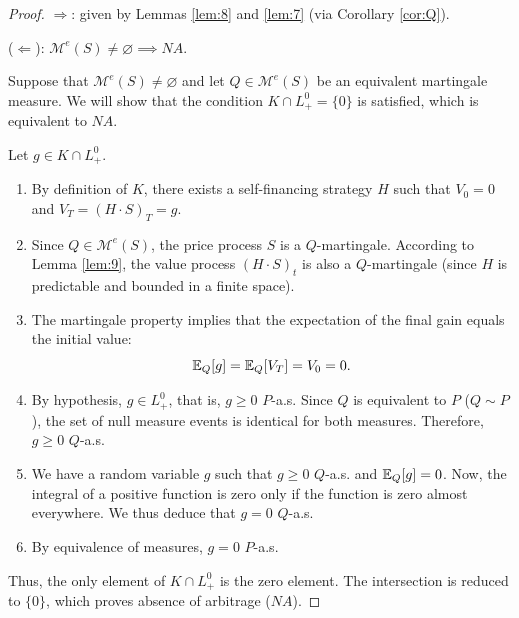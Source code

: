 \begin{proof}
\emph{$\Rightarrow$}: given by Lemmas \ref{lem:8} and \ref{lem:7} (via Corollary \ref{cor:Q}).

\smallskip
\noindent
(\emph{$\Leftarrow$}): $\mathcal{M}^e(S) \neq \varnothing \implies NA$.

\smallskip
Suppose that $\mathcal{M}^e(S) \neq \varnothing$ and let $Q \in \mathcal{M}^e(S)$ be an equivalent martingale measure.
We will show that the condition $K \cap L_+^0 = \{0\}$ is satisfied, which is equivalent to $NA$.

Let $g \in K \cap L_+^0$.
\begin{enumerate}
    \item By definition of $K$, there exists a self-financing strategy $H$ such that $V_0 = 0$ and $V_T = (H \cdot S)_T = g$.
    \item Since $Q \in \mathcal{M}^e(S)$, the price process $S$ is a $Q$-martingale. According to Lemma \ref{lem:9}, the value process $(H \cdot S)_t$ is also a $Q$-martingale (since $H$ is predictable and bounded in a finite space).
    \item The martingale property implies that the expectation of the final gain equals the initial value:
    \[
    \mathbb{E}_Q[g] = \mathbb{E}_Q[V_T] = V_0 = 0.
    \]
    \item By hypothesis, $g \in L_+^0$, that is, $g \ge 0$ $P$-a.s.
    Since $Q$ is equivalent to $P$ ($Q \sim P$), the set of null measure events is identical for both measures. Therefore, $g \ge 0$ $Q$-a.s.
    \item We have a random variable $g$ such that $g \ge 0$ $Q$-a.s. and $\mathbb{E}_Q[g] = 0$.
    Now, the integral of a positive function is zero only if the function is zero almost everywhere.
    We thus deduce that $g = 0$ $Q$-a.s.
    \item By equivalence of measures, $g = 0$ $P$-a.s.
\end{enumerate}
Thus, the only element of $K \cap L_+^0$ is the zero element. The intersection is reduced to $\{0\}$, which proves absence of arbitrage ($NA$).
\end{proof}
